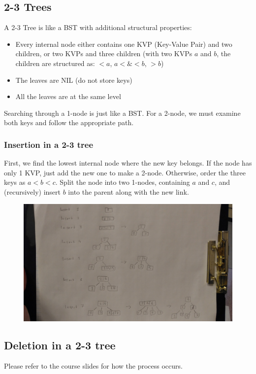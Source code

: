 \documentclass{report}
\begin{document}
\subsection{2-3 Trees}
A 2-3 Tree is like a BST with additional structural properties:
\begin{itemize}
\item Every internal node either contains one KVP (Key-Value Pair) and two children, or two KVPs and three children (with two KVPs $a$ and $b$, the children are structured as: $< a$, $a < \& < b$, $> b$)
\item The leaves are NIL (do not store keys)
\item All the leaves are at the same level
\end{itemize}
Searching through a 1-node is just like a BST. For a 2-node, we must examine both keys and follow the appropriate path.
\subsubsection{Insertion in a 2-3 tree}
First, we find the lowest internal node where the new key belongs. If the node has only 1 KVP, just add the new one to make a 2-node. Otherwise, order the three keys as $a < b < c$. Split the node into two 1-nodes, containing $a$ and $c$, and (recursively) insert $b$ into the parent along with the new link.
\begin{figure}[ht]
\begin{center}
\includegraphics[scale=0.1]{img.jpg}
\end{center}
\end{figure}
\subsection{Deletion in a 2-3 tree}
Please refer to the course slides for how the process occurs.
\end{document}
